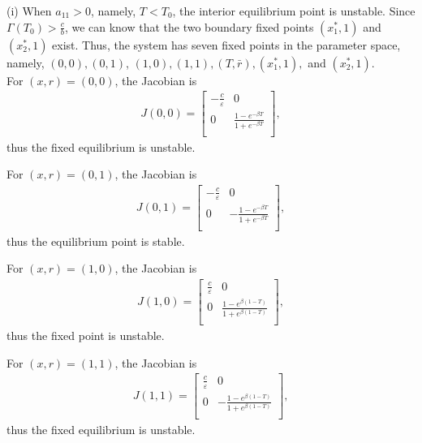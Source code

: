 \documentclass[9pt]{elife}
\begin{document}
\begin{appendixbox}
(i) When $a_{11}>0$, namely, $T<T_{0}$, the interior equilibrium point is unstable. Since $\Gamma(T_{0})>\frac{c}{b}$, we can know that the two boundary fixed points $(x_{1}^{*}, 1)$ and $(x_{2}^{*}, 1)$ exist. Thus, the system has seven fixed points in the parameter space, namely, $(0, 0), (0, 1)$, $(1,0), (1, 1), (T, \bar{r}), (x_{1}^{*},1),$ and $(x_{2}^{*},1)$.\\

For $(x, r) = (0, 0)$, the Jacobian is
\begin{eqnarray*}
J(0, 0) =
  \left[ {\begin{array}{cc}
    -\frac{c}{\varepsilon} & 0 \\
    0 & \frac{1-e^{-\beta T}}{1+e^{-\beta T}} \\
  \end{array} } \right],
\end{eqnarray*}
thus the fixed equilibrium is unstable.

For $(x, r) = (0, 1)$, the Jacobian is
\begin{eqnarray*}
J(0, 1) =
  \left[ {\begin{array}{cc}
    -\frac{c}{\varepsilon} & 0 \\
    0 & -\frac{1-e^{-\beta T}}{1+e^{-\beta T}} \\
  \end{array} } \right],
\end{eqnarray*}
thus the equilibrium point is stable.

For $(x, r) = (1, 0)$, the Jacobian is
\begin{eqnarray*}
J(1, 0) =
  \left[ {\begin{array}{cc}
    \frac{c}{\varepsilon} & 0 \\
    0 & \frac{1-e^{\beta (1-T)}}{1+e^{\beta (1-T)}} \\
  \end{array} } \right],
\end{eqnarray*}
thus the fixed point is unstable.

For $(x, r) = (1, 1)$, the Jacobian is
\begin{eqnarray*}
J(1, 1) =
  \left[ {\begin{array}{cc}
    \frac{c}{\varepsilon} & 0 \\
    0 & -\frac{1-e^{\beta (1-T)}}{1+e^{\beta (1-T)}} \\
  \end{array} } \right],
\end{eqnarray*}
thus the fixed equilibrium is unstable.


\end{appendixbox}
\end{document}
